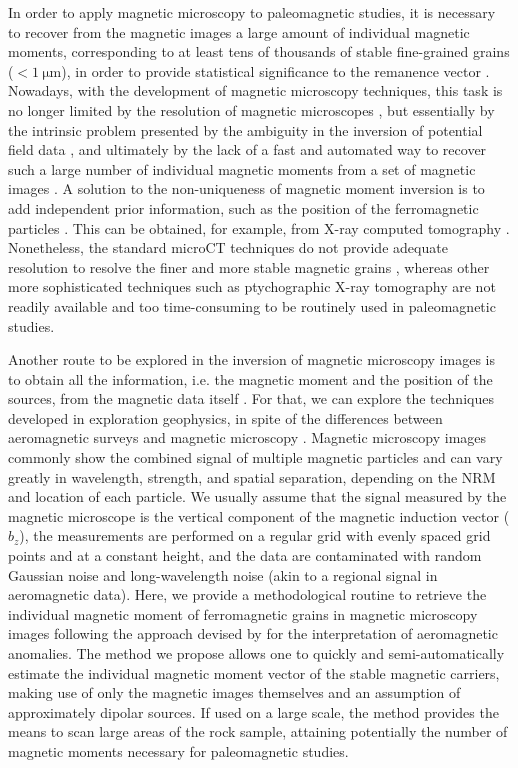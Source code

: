 In order to apply magnetic microscopy to paleomagnetic studies, it is necessary
to recover from the magnetic images a large amount of individual magnetic
moments, corresponding to at least tens of thousands of stable fine-grained
grains ($< \qty{1}{\um}$), in order to provide statistical significance to the
remanence vector \citep[e.g., ][]{Berndt2016}. Nowadays, with the development of
magnetic microscopy techniques, this task is no longer limited by the
resolution of magnetic microscopes \citep{Fu2020, Weiss2007, DeGroot2018,
Glenn2017, Lima2014}, but essentially by the intrinsic problem presented by the
ambiguity in the inversion of potential field data \citep{Barbosa2011,
DeGroot2021, Oliveira2015Estimation}, and ultimately by the lack of a fast and
automated way to recover such a large number of individual magnetic moments
from a set of magnetic images \citep{CortesOrtuno2022, Lima2013, Lima2009}. A
solution to the non-uniqueness of magnetic moment inversion is to add
independent prior information, such as the position of the ferromagnetic
particles \citep{Fabian2019}. This can be obtained, for example, from X-ray
computed tomography \citep[microCT; ][]{Fabian2019, DeGroot2021, DeGroot2018}.
Nonetheless, the standard microCT techniques do not provide adequate resolution
to resolve the finer and more stable magnetic grains \citep{CortesOrtuno2022,
DeGroot2021}, whereas other more sophisticated techniques such as ptychographic
X-ray tomography \citep[e.g., ][]{Maldanis2020} are not readily available and
too time-consuming to be routinely used in paleomagnetic studies.

Another route to be explored in the inversion of magnetic microscopy images is
to obtain all the information, i.e. the magnetic moment and the position of the
sources, from the magnetic data itself \citep[e.g., ][]{Fu2020}. For that, we can
explore the techniques developed in exploration geophysics, in spite of the
differences between aeromagnetic surveys and magnetic microscopy
\citep{Lima2013}. Magnetic microscopy images commonly show the combined signal
of multiple magnetic particles and can vary greatly in wavelength, strength,
and spatial separation, depending on the NRM and location of each particle. We
usually assume that the signal measured by the magnetic microscope is the
vertical component of the magnetic induction vector ($b_z$), the measurements
are performed on a regular grid with evenly spaced grid points and at a
constant height, and the data are contaminated with random Gaussian noise and
long-wavelength noise (akin to a regional signal in aeromagnetic data). Here,
we provide a methodological routine to retrieve the individual magnetic moment
of ferromagnetic grains in magnetic microscopy images following the approach
devised by \citet{Oliveira2015Estimation} for the interpretation of
aeromagnetic anomalies. The method we propose allows one to quickly and
semi-automatically estimate the individual magnetic moment vector of the stable
magnetic carriers, making use of only the magnetic images themselves and an
assumption of approximately dipolar sources. If used on a large scale, the
method provides the means to scan large areas of the rock sample, attaining
potentially the number of magnetic moments necessary for paleomagnetic studies.


